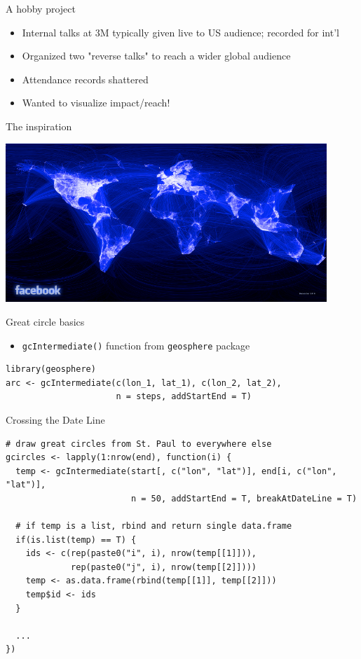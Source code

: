 \documentclass[sans,aspectratio=169,presentation,bigger,fleqn]{beamer}
\begin{document}
\begin{frame}[label=sec-15]{A hobby project}
\begin{itemize}
\item Internal talks at 3M typically given live to US audience; recorded for int'l
\item Organized two "reverse talks" to reach a wider global audience
\item Attendance records shattered
\item Wanted to visualize impact/reach!
\end{itemize}
\end{frame}
\begin{frame}[label=sec-16]{The inspiration}
\begin{center}
\includegraphics[height=6cm]{./img/facebook-map-lo.png}
\end{center}
\end{frame}
\begin{frame}[fragile,label=sec-17]{Great circle basics}
 \begin{itemize}
\item \texttt{gcIntermediate()} function from  \texttt{geosphere} package
\end{itemize}

\scriptsize
\begin{verbatim}
library(geosphere)
arc <- gcIntermediate(c(lon_1, lat_1), c(lon_2, lat_2),
                      n = steps, addStartEnd = T)
\end{verbatim}
\end{frame}
\begin{frame}[fragile,label=sec-18]{Crossing the Date Line}
 \scriptsize
\begin{verbatim}
# draw great circles from St. Paul to everywhere else
gcircles <- lapply(1:nrow(end), function(i) {
  temp <- gcIntermediate(start[, c("lon", "lat")], end[i, c("lon", "lat")],
                         n = 50, addStartEnd = T, breakAtDateLine = T)

  # if temp is a list, rbind and return single data.frame
  if(is.list(temp) == T) {
    ids <- c(rep(paste0("i", i), nrow(temp[[1]])),
             rep(paste0("j", i), nrow(temp[[2]])))
    temp <- as.data.frame(rbind(temp[[1]], temp[[2]]))
    temp$id <- ids
  }
  
  ...
})
\end{verbatim}
\normalsize
\end{frame}
\end{document}
